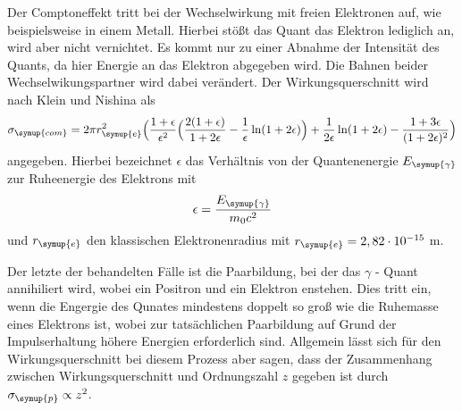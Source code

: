 Der Comptoneffekt tritt bei der Wechselwirkung mit freien Elektronen auf, wie beispielsweise in einem Metall. Hierbei stößt das Quant das Elektron lediglich an,
wird aber nicht vernichtet. Es kommt nur zu einer Abnahme der Intensität des Quants, da hier Energie an das Elektron abgegeben wird. Die Bahnen
beider Wechselwikungspartner wird dabei verändert. Der Wirkungsquerschnitt wird nach Klein und Nishina als 
\begin{equation}
    \label{eqn:wirkung_comp}
    \sigma_{\symup{com}} = 2 \pi r_{\symup{e}}^2 \Bigl(\frac{1 + \epsilon}{\epsilon^2} \Bigl( \frac{2(1 + \epsilon)}{1+ 2 \epsilon} - \frac{1}{\epsilon} \ln(1 + 2 \epsilon)  \Bigr ) + \frac{1}{2 \epsilon} \ln(1 + 2 \epsilon)  - \frac{1 + 3 \epsilon}{(1 + 2 \epsilon)^2} \Bigr )
\end{equation}    
angegeben. Hierbei bezeichnet $\epsilon$ das Verhältnis von der Quantenenergie $E_{\symup{\gamma}}$ zur Ruheenergie des Elektrons mit 
\begin{equation}
    \label{eqn:epsilon}
    \epsilon = \frac{E_{\symup{\gamma}}}{m_0 c^2}
\end{equation}    
und $r_{\symup{e}}$ den klassischen Elektronenradius mit $r_{\symup{e}} = 2,82 \cdot 10^{-15}$ m.

Der letzte der behandelten Fälle ist die Paarbildung, bei der das $\gamma$ - Quant annihiliert wird, wobei ein Positron und ein Elektron enstehen.
Dies tritt ein, wenn die Engergie des Qunates mindestens doppelt so groß wie die Ruhemasse eines Elektrons ist, wobei zur tatsächlichen 
Paarbildung auf Grund der Impulserhaltung höhere Energien erforderlich sind. Allgemein lässt sich für den Wirkungsquerschnitt bei diesem
Prozess aber sagen, dass der Zusammenhang zwischen Wirkungsquerschnitt und Ordnungszahl $z$ gegeben ist durch $ \sigma_{\symup{p}} \propto z^2$.

